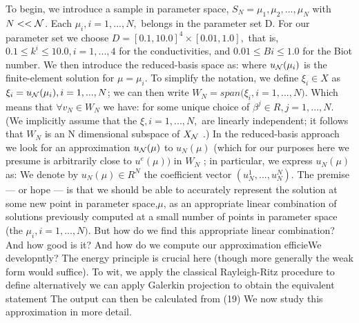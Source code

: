 To begin, we introduce a sample in parameter space, $S_N = {\mu_1 , \mu_2 , . . . , \mu_N }$
with $N << \cal N$. Each $\mu_i , i = 1, . . . , N ,$ belongs in the parameter set D. For our parameter set we choose $D = [0.1, 10.0]^4 \times [0.01, 1.0],$ that is, $0.1 \leq k^i \leq 10.0, i =1, . . . , 4$ for the conductivities, and $0.01 \leq Bi \leq 1.0$ for the Biot number. We then introduce the reduced-basis space as:
where $u_{\cal N} (\mu_i)$ is the finite-element solution for $\mu = \mu_i$.
To simplify the notation, we define $\xi_i \in X$ as $\xi_i  = u_{\cal N} (\mu_i), i = 1, . . . , N $; we can then write $W_N = span \big(\xi_i , i = 1, . . . , N \big)$. Which means that $\forall v_N \in W_N$ we have:
for some unique choice of $\beta^j \in R, j = 1, . . . , N $. (We implicitly assume that the $\xi , i = 1, . . . , N,$ are linearly independent; it follows that $W_N$ is an N dimensional subspace of $X_{\cal N}$ .) In the reduced-basis approach we look for an approximation $u_{\cal N} (\mu)$ to $u_{ N} (\mu)$ (which for our purposes here we presume is arbitrarily close to $u^{e} (\mu))$ in $W_N$ ; in particular, we express $u_N (\mu)$ as:
We denote by $u_N (\mu) \in R^N$ the coefficient vector $(u^1_N , . . . , u^N
_N )$. The premise — or hope — is that we should be able to accurately represent the solution at some new point in parameter space,$\mu$, as an appropriate linear combination of
solutions previously computed at a small number of points in parameter space (the $\mu_i , i = 1, . . . , N )$. But how do we find this appropriate linear combination? And how good is it? And how do we compute our approximation efficieWe developntly? The energy principle is crucial here (though more generally the weak form would suffice). To wit, we apply the classical Rayleigh-Ritz procedure to define
alternatively we can apply Galerkin projection to obtain the equivalent statement
The output can then be calculated from
 {(19)}
We now study this approximation in more detail.
